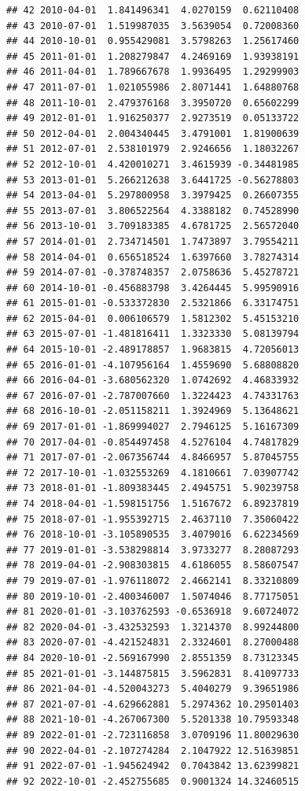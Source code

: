 \documentclass[
]{article}
\begin{document}
\begin{verbatim}
## 42 2010-04-01  1.841496341  4.0270159  0.62110408
## 43 2010-07-01  1.519987035  3.5639054  0.72008360
## 44 2010-10-01  0.955429081  3.5798263  1.25617460
## 45 2011-01-01  1.208279847  4.2469169  1.93938191
## 46 2011-04-01  1.789667678  1.9936495  1.29299903
## 47 2011-07-01  1.021055986  2.8071441  1.64880768
## 48 2011-10-01  2.479376168  3.3950720  0.65602299
## 49 2012-01-01  1.916250377  2.9273519  0.05133722
## 50 2012-04-01  2.004340445  3.4791001  1.81900639
## 51 2012-07-01  2.538101979  2.9246656  1.18032267
## 52 2012-10-01  4.420010271  3.4615939 -0.34481985
## 53 2013-01-01  5.266212638  3.6441725 -0.56278803
## 54 2013-04-01  5.297800958  3.3979425  0.26607355
## 55 2013-07-01  3.806522564  4.3388182  0.74528990
## 56 2013-10-01  3.709183385  4.6781725  2.56572040
## 57 2014-01-01  2.734714501  1.7473897  3.79554211
## 58 2014-04-01  0.656518524  1.6397660  3.78274314
## 59 2014-07-01 -0.378748357  2.0758636  5.45278721
## 60 2014-10-01 -0.456883798  3.4264445  5.99590916
## 61 2015-01-01 -0.533372830  2.5321866  6.33174751
## 62 2015-04-01  0.006106579  1.5812302  5.45153210
## 63 2015-07-01 -1.481816411  1.3323330  5.08139794
## 64 2015-10-01 -2.489178857  1.9683815  4.72056013
## 65 2016-01-01 -4.107956164  1.4559690  5.68808820
## 66 2016-04-01 -3.680562320  1.0742692  4.46833932
## 67 2016-07-01 -2.787007660  1.3224423  4.74331763
## 68 2016-10-01 -2.051158211  1.3924969  5.13648621
## 69 2017-01-01 -1.869994027  2.7946125  5.16167309
## 70 2017-04-01 -0.854497458  4.5276104  4.74817829
## 71 2017-07-01 -2.067356744  4.8466957  5.87045755
## 72 2017-10-01 -1.032553269  4.1810661  7.03907742
## 73 2018-01-01 -1.809383445  2.4945751  5.90239758
## 74 2018-04-01 -1.598151756  1.5167672  6.89237819
## 75 2018-07-01 -1.955392715  2.4637110  7.35060422
## 76 2018-10-01 -3.105890535  3.4079016  6.62234569
## 77 2019-01-01 -3.538298814  3.9733277  8.28087293
## 78 2019-04-01 -2.908303815  4.6186055  8.58607547
## 79 2019-07-01 -1.976118072  2.4662141  8.33210809
## 80 2019-10-01 -2.400346007  1.5074046  8.77175051
## 81 2020-01-01 -3.103762593 -0.6536918  9.60724072
## 82 2020-04-01 -3.432532593  1.3214370  8.99244800
## 83 2020-07-01 -4.421524831  2.3324601  8.27000488
## 84 2020-10-01 -2.569167990  2.8551359  8.73123345
## 85 2021-01-01 -3.144875815  3.5962831  8.41097733
## 86 2021-04-01 -4.520043273  5.4040279  9.39651986
## 87 2021-07-01 -4.629662881  5.2974362 10.29501403
## 88 2021-10-01 -4.267067300  5.5201338 10.79593348
## 89 2022-01-01 -2.723116858  3.0709196 11.80029630
## 90 2022-04-01 -2.107274284  2.1047922 12.51639851
## 91 2022-07-01 -1.945624942  0.7043842 13.62399821
## 92 2022-10-01 -2.452755685  0.9001324 14.32460515
\end{verbatim}
\end{document}

